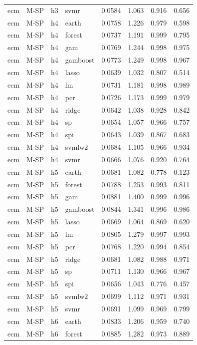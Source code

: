 \begin{ThreePartTable}
\begin{longtable}[t]{llclcccc}
ecm & M-SP & h3 & svmr & 0.0584 & 1.063 & 0.916 & 0.656\\
\addlinespace
ecm & M-SP & h4 & earth & 0.0758 & 1.226 & 0.979 & 0.598\\
ecm & M-SP & h4 & forest & 0.0737 & 1.191 & 0.999 & 0.795\\
ecm & M-SP & h4 & gam & 0.0769 & 1.244 & 0.998 & 0.975\\
ecm & M-SP & h4 & gamboost & 0.0773 & 1.249 & 0.998 & 0.967\\
ecm & M-SP & h4 & lasso & 0.0639 & 1.032 & 0.807 & 0.514\\
ecm & M-SP & h4 & lm & 0.0731 & 1.181 & 0.998 & 0.989\\
ecm & M-SP & h4 & pcr & 0.0726 & 1.173 & 0.999 & 0.979\\
ecm & M-SP & h4 & ridge & 0.0642 & 1.038 & 0.928 & 0.842\\
ecm & M-SP & h4 & sp & 0.0654 & 1.057 & 0.966 & 0.757\\
ecm & M-SP & h4 & spi & 0.0643 & 1.039 & 0.867 & 0.683\\
ecm & M-SP & h4 & svmlw2 & 0.0684 & 1.105 & 0.966 & 0.934\\
ecm & M-SP & h4 & svmr & 0.0666 & 1.076 & 0.920 & 0.764\\
\addlinespace
ecm & M-SP & h5 & earth & 0.0681 & 1.082 & 0.778 & 0.123\\
ecm & M-SP & h5 & forest & 0.0788 & 1.253 & 0.993 & 0.811\\
ecm & M-SP & h5 & gam & 0.0881 & 1.400 & 0.999 & 0.996\\
ecm & M-SP & h5 & gamboost & 0.0844 & 1.341 & 0.996 & 0.986\\
ecm & M-SP & h5 & lasso & 0.0669 & 1.064 & 0.869 & 0.620\\
ecm & M-SP & h5 & lm & 0.0805 & 1.279 & 0.997 & 0.993\\
ecm & M-SP & h5 & pcr & 0.0768 & 1.220 & 0.994 & 0.854\\
ecm & M-SP & h5 & ridge & 0.0681 & 1.082 & 0.988 & 0.971\\
ecm & M-SP & h5 & sp & 0.0711 & 1.130 & 0.966 & 0.967\\
ecm & M-SP & h5 & spi & 0.0656 & 1.043 & 0.776 & 0.457\\
ecm & M-SP & h5 & svmlw2 & 0.0699 & 1.112 & 0.971 & 0.931\\
ecm & M-SP & h5 & svmr & 0.0691 & 1.099 & 0.969 & 0.799\\
\addlinespace
ecm & M-SP & h6 & earth & 0.0833 & 1.206 & 0.959 & 0.740\\
ecm & M-SP & h6 & forest & 0.0885 & 1.282 & 0.973 & 0.889\\

\end{longtable}
\end{ThreePartTable}
